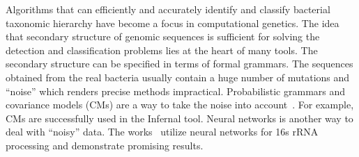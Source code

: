 \documentclass[a0paper,portrait]{baposter}
\begin{document}
\begin{poster}
{Algorithms that can efficiently and accurately identify and classify bacterial taxonomic hierarchy have become a focus in computational genetics.
The idea that secondary structure of genomic sequences is sufficient for solving the detection and classification problems lies at the heart of many tools.%
The secondary structure can be specified in terms of formal grammars. 
The sequences obtained from the real bacteria usually contain a huge number of mutations and ``noise'' which renders precise methods impractical. 
Probabilistic grammars and covariance models (CMs) are a way to take the noise into account~\cite{EddyDurbin}.
For example, CMs are successfully used in the Infernal tool. %
Neural networks is another way to deal with ``noisy'' data. 
The works~\cite{Humidor, ANN} utilize neural networks for 16s rRNA processing and demonstrate promising results. 
\vspace{0.17cm}
}

    
\end{poster}
\end{document}
